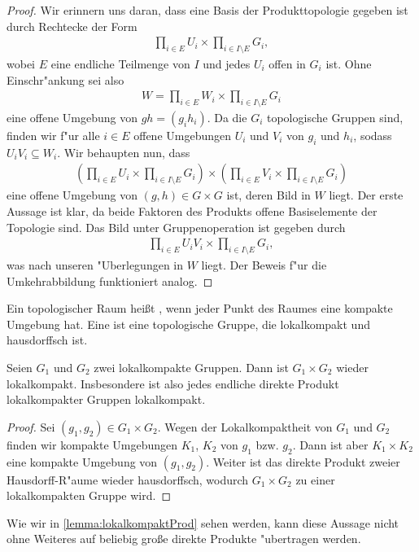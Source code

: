 	\begin{proof}
		Wir erinnern uns daran, dass eine Basis der Produkttopologie gegeben ist durch Rechtecke der Form
		\begin{align*}
			\prod_{i \in E} U_i \times \prod_{i \in I\setminus E}  G_i,
		\end{align*}
		wobei $E$ eine endliche Teilmenge von $I$ und jedes $U_i$ offen in $G_i$ ist. Ohne Einschr"ankung sei also 
		\begin{align*}
			W = \prod_{i \in E} W_i \times \prod_{i \in I\setminus E}  G_i
		\end{align*}
		eine offene Umgebung von $gh = (g_i h_i)$. Da die $G_i$ topologische Gruppen sind, finden wir f"ur  alle $i\in E$ offene Umgebungen $U_i$ und $V_i$ von $g_i$ und $h_i$,  sodass  $U_i V_i \subseteq W_i$. Wir behaupten nun, dass
		\begin{align*}
			(\prod_{i \in E} U_i \times \prod_{i \in I\setminus E}  G_i) \times (\prod_{i \in E} V_i \times \prod_{i \in I\setminus E}  G_i)
		\end{align*}
		eine offene Umgebung von $(g, h) \in G \times G$ ist, deren Bild in $W$ liegt. Der erste Aussage ist klar, da beide Faktoren des Produkts offene Basiselemente der Topologie sind. Das Bild unter Gruppenoperation ist gegeben durch
		\begin{align*}
			\prod_{i \in E} U_i V_i \times \prod_{i \in I\setminus E}  G_i,
		\end{align*}
		was nach unseren "Uberlegungen in $W$ liegt. Der Beweis f"ur die Umkehrabbildung funktioniert analog.
	\end{proof}
	\begin{defi}
		Ein topologischer Raum heißt , wenn jeder Punkt des Raumes eine kompakte Umgebung hat. Eine  ist eine topologische Gruppe, die lokalkompakt und hausdorffsch ist. 
	\end{defi}
	\begin{lemma}
		Seien $G_1$ und $G_2$ zwei lokalkompakte Gruppen. Dann ist $G_1\times G_2$ wieder lokalkompakt. Insbesondere ist also jedes endliche direkte Produkt lokalkompakter Gruppen lokalkompakt.
	\end{lemma}
	\begin{proof}
		Sei $(g_1,g_2) \in G_1\times G_2$. Wegen der Lokalkompaktheit von $G_1$ und $G_2$ finden wir kompakte Umgebungen $K_1$, $K_2$ von $g_1$ bzw. $g_2$. Dann ist aber $K_1 \times K_2$ eine kompakte Umgebung von $(g_1,g_2)$. Weiter ist das direkte Produkt zweier Hausdorff-R"aume wieder hausdorffsch, wodurch $G_1\times G_2$ zu einer lokalkompakten Gruppe wird.
	\end{proof}
	Wie wir in \ref{lemma:lokalkompaktProd} sehen werden, kann diese Aussage nicht ohne Weiteres auf beliebig gro\ss e direkte Produkte "ubertragen werden.

